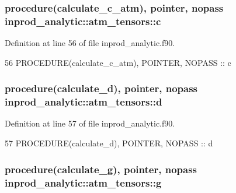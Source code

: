 \subsubsection[{\texorpdfstring{c}{c}}]{\setlength{\rightskip}{0pt plus 5cm}procedure({\bf calculate\+\_\+c\+\_\+atm}), pointer, nopass inprod\+\_\+analytic\+::atm\+\_\+tensors\+::c\hspace{0.3cm}{\ttfamily [private]}}\hypertarget{structinprod__analytic_1_1atm__tensors_a1fcb71de592cf7d87e8c7e13e445832c}{}\label{structinprod__analytic_1_1atm__tensors_a1fcb71de592cf7d87e8c7e13e445832c}


Definition at line 56 of file inprod\+\_\+analytic.\+f90.


\begin{DoxyCode}
56      \textcolor{keywordtype}{PROCEDURE}(calculate\_c\_atm), \textcolor{keywordtype}{POINTER}, \textcolor{keywordtype}{NOPASS} :: c
\end{DoxyCode}
\subsubsection[{\texorpdfstring{d}{d}}]{\setlength{\rightskip}{0pt plus 5cm}procedure({\bf calculate\+\_\+d}), pointer, nopass inprod\+\_\+analytic\+::atm\+\_\+tensors\+::d\hspace{0.3cm}{\ttfamily [private]}}\hypertarget{structinprod__analytic_1_1atm__tensors_a0641c2984e3cf9eff629771519162b05}{}\label{structinprod__analytic_1_1atm__tensors_a0641c2984e3cf9eff629771519162b05}


Definition at line 57 of file inprod\+\_\+analytic.\+f90.


\begin{DoxyCode}
57      \textcolor{keywordtype}{PROCEDURE}(calculate\_d), \textcolor{keywordtype}{POINTER}, \textcolor{keywordtype}{NOPASS} :: d
\end{DoxyCode}
\subsubsection[{\texorpdfstring{g}{g}}]{\setlength{\rightskip}{0pt plus 5cm}procedure({\bf calculate\+\_\+g}), pointer, nopass inprod\+\_\+analytic\+::atm\+\_\+tensors\+::g\hspace{0.3cm}{\ttfamily [private]}}\hypertarget{structinprod__analytic_1_1atm__tensors_a4543ab64bfdcdb2aac1f2d9b1af2ee36}{}\label{structinprod__analytic_1_1atm__tensors_a4543ab64bfdcdb2aac1f2d9b1af2ee36}


